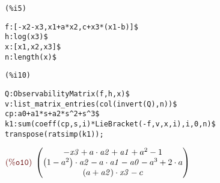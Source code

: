 \noindent
\begin{minipage}[t]{8ex}\color{red}\bf
\begin{verbatim}
(%i5) 
\end{verbatim}
\end{minipage}
\begin{minipage}[t]{\textwidth}\color{blue}
\begin{verbatim}
f:[-x2-x3,x1+a*x2,c+x3*(x1-b)]$
h:log(x3)$
x:[x1,x2,x3]$
n:length(x)$
\end{verbatim}
\end{minipage}

\smallskip

\noindent
\begin{minipage}[t]{8ex}\color{red}\bf
\begin{verbatim}
(%i10) 
\end{verbatim}
\end{minipage}
\begin{minipage}[t]{\textwidth}\color{blue}
\begin{verbatim}
Q:ObservabilityMatrix(f,h,x)$
v:list_matrix_entries(col(invert(Q),n))$
cp:a0+a1*s+a2*s^2+s^3$
k1:sum(coeff(cp,s,i)*LieBracket(-f,v,x,i),i,0,n)$
transpose(ratsimp(k1));
\end{verbatim}
\end{minipage}

\noindent
$\displaystyle
\parbox{8ex}{$\color{labelcolor}\mathrm{\tt (\%o10) }\quad $}
\begin{pmatrix}-\mathit{x3}+a\cdot \mathit{a2}+\mathit{a1}+{{a}^{2}}-1\cr \left( 1-{{a}^{2}}\right) \cdot \mathit{a2}-a\cdot \mathit{a1}-\mathit{a0}-{{a}^{3}}+2\cdot a\cr \left( a+\mathit{a2}\right) \cdot \mathit{x3}-c\end{pmatrix}\mbox{}
$
